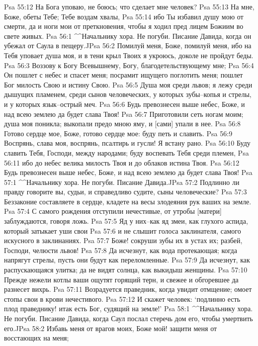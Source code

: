 Psa 55:12  На Бога уповаю, не боюсь; что сделает мне человек?
Psa 55:13  На мне, Боже, обеты Тебе; Тебе воздам хвалы,
Psa 55:14  ибо Ты избавил душу мою от смерти, да и ноги мои от преткновения, чтобы я ходил пред лицем Божиим во свете живых.
Psa 56:1  ^^Начальнику хора. Не погуби. Писание Давида, когда он убежал от Саула в пещеру.^^
Psa 56:2  Помилуй меня, Боже, помилуй меня, ибо на Тебя уповает душа моя, и в тени крыл Твоих я укроюсь, доколе не пройдут беды.
Psa 56:3  Воззову к Богу Всевышнему, Богу, благодетельствующему мне;
Psa 56:4  Он пошлет с небес и спасет меня; посрамит ищущего поглотить меня; пошлет Бог милость Свою и истину Свою.
Psa 56:5  Душа моя среди львов; я лежу среди дышущих пламенем, среди сынов человеческих, у которых зубы--копья и стрелы, и у которых язык--острый меч.
Psa 56:6  Будь превознесен выше небес, Боже, и над всею землею да будет слава Твоя!
Psa 56:7  Приготовили сеть ногам моим; душа моя поникла; выкопали предо мною яму, и [сами] упали в нее.
Psa 56:8  Готово сердце мое, Боже, готово сердце мое: буду петь и славить.
Psa 56:9  Воспрянь, слава моя, воспрянь, псалтирь и гусли! Я встану рано.
Psa 56:10  Буду славить Тебя, Господи, между народами; буду воспевать Тебя среди племен,
Psa 56:11  ибо до небес велика милость Твоя и до облаков истина Твоя.
Psa 56:12  Будь превознесен выше небес, Боже, и над всею землею да будет слава Твоя!
Psa 57:1  ^^Начальнику хора. Не погуби. Писание Давида.^^
Psa 57:2  Подлинно ли правду говорите вы, судьи, и справедливо судите, сыны человеческие?
Psa 57:3  Беззаконие составляете в сердце, кладете на весы злодеяния рук ваших на земле.
Psa 57:4  С самого рождения отступили нечестивые, от утробы [матери] заблуждаются, говоря ложь.
Psa 57:5  Яд у них--как яд змеи, как глухого аспида, который затыкает уши свои
Psa 57:6  и не слышит голоса заклинателя, самого искусного в заклинаниях.
Psa 57:7  Боже! сокруши зубы их в устах их; разбей, Господи, челюсти львов!
Psa 57:8  Да исчезнут, как вода протекающая; когда напрягут стрелы, пусть они будут как переломленные.
Psa 57:9  Да исчезнут, как распускающаяся улитка; да не видят солнца, как выкидыш женщины.
Psa 57:10  Прежде нежели котлы ваши ощутят горящий терн, и свежее и обгоревшее да разнесет вихрь.
Psa 57:11  Возрадуется праведник, когда увидит отмщение; омоет стопы свои в крови нечестивого.
Psa 57:12  И скажет человек: `подлинно есть плод праведнику! итак есть Бог, судящий на земле!'
Psa 58:1  ^^Начальнику хора. Не погуби. Писание Давида, когда Саул послал стеречь дом его, чтобы умертвить его.^^
Psa 58:2  Избавь меня от врагов моих, Боже мой! защити меня от восстающих на меня;
